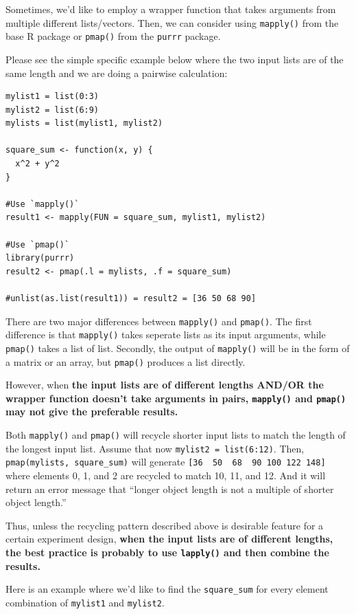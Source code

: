 \documentclass[
]{book}
\begin{document}
Sometimes, we'd like to employ a wrapper function that takes arguments from multiple different lists/vectors. Then, we can consider using \texttt{mapply()} from the base R package or \texttt{pmap()} from the \texttt{purrr} package.

Please see the simple specific example below where the two input lists are of the same length and we are doing a pairwise calculation:

\begin{verbatim}
mylist1 = list(0:3)
mylist2 = list(6:9)
mylists = list(mylist1, mylist2)

square_sum <- function(x, y) {
  x^2 + y^2
}

#Use `mapply()`
result1 <- mapply(FUN = square_sum, mylist1, mylist2)

#Use `pmap()`
library(purrr)
result2 <- pmap(.l = mylists, .f = square_sum)

#unlist(as.list(result1)) = result2 = [36 50 68 90]
\end{verbatim}

There are two major differences between \texttt{mapply()} and \texttt{pmap()}. The first difference is that \texttt{mapply()} takes seperate lists as its input arguments, while \texttt{pmap()} takes a list of list. Secondly, the output of \texttt{mapply()} will be in the form of a matrix or an array, but \texttt{pmap()} produces a list directly.

However, when \textbf{the input lists are of different lengths AND/OR the wrapper function doesn't take arguments in pairs, \texttt{mapply()} and \texttt{pmap()} may not give the preferable results.}

Both \texttt{mapply()} and \texttt{pmap()} will recycle shorter input lists to match the length of the longest input list. Assume that now \texttt{mylist2\ =\ list(6:12)}. Then, \texttt{pmap(mylists,\ square\_sum)} will generate \texttt{{[}36\ \ 50\ \ 68\ \ 90\ 100\ 122\ 148{]}} where elements 0, 1, and 2 are recycled to match 10, 11, and 12. And it will return an error message that ``longer object length is not a multiple of shorter object length.''

Thus, unless the recycling pattern described above is desirable feature for a certain experiment design, \textbf{when the input lists are of different lengths, the best practice is probably to use \texttt{lapply()} and then combine the results.}

Here is an example where we'd like to find the \texttt{square\_sum} for every element combination of \texttt{mylist1} and \texttt{mylist2}.
\end{document}
